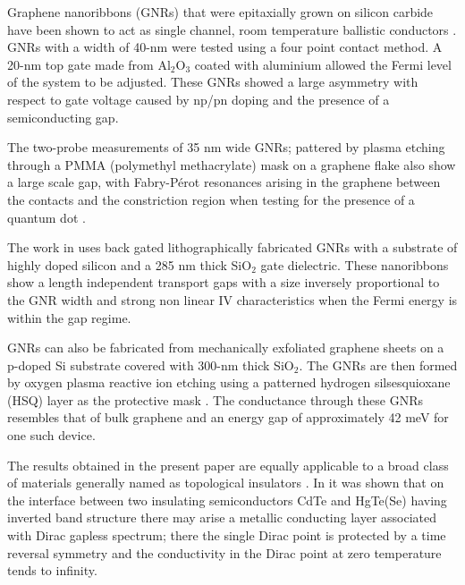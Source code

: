 \documentclass[prl,twocolumn,aps,superscriptaddress,floatfix,10pt]{revtex4}
\begin{document}
	Graphene nanoribbons (GNRs) that were epitaxially grown on silicon carbide have been shown to act as single channel, room temperature ballistic conductors  \cite{b11}. GNRs with a width of 40-nm were tested using a four point contact method. A 20-nm top gate made from Al$_{2}$O$_{3}$ coated with aluminium allowed the Fermi level of the system to be adjusted. These GNRs showed a large asymmetry with respect to gate voltage caused by np/pn doping and the presence of a semiconducting gap.

	The two-probe measurements of 35 nm wide GNRs; pattered by plasma etching through a PMMA (polymethyl methacrylate) mask on a graphene flake also show a large scale gap, with Fabry-P\'{e}rot resonances arising in the graphene between the contacts and the constriction region when testing for the presence of a quantum dot \cite{b14}.

	The work in \cite{b12} uses back gated lithographically fabricated GNRs with a substrate of highly doped silicon and a 285 nm thick SiO$_2$ gate dielectric. These nanoribbons show a length independent transport gaps with a size inversely proportional to the GNR width and strong non linear IV characteristics when the Fermi energy is within the gap regime.

	GNRs can also be fabricated from mechanically exfoliated graphene sheets on a p-doped Si substrate covered with 300-nm thick SiO$_2$. The GNRs are then formed by oxygen plasma reactive ion etching using a patterned hydrogen silsesquioxane (HSQ) layer as the protective mask \cite{b13}. The conductance through these GNRs resembles that of bulk graphene and an energy gap of approximately 42 meV for one such device.
	
	The results obtained in the present paper are equally applicable to a broad class of materials generally named as topological insulators \cite{d4,d5}.  In \cite{d4} it was shown that on the interface between two insulating semiconductors CdTe and HgTe(Se) having inverted band structure there may arise a metallic conducting layer associated with Dirac gapless spectrum;
	there the  single Dirac point %
	is protected by a time reversal symmetry and the conductivity in the Dirac point at zero temperature tends to infinity.
\end{document}
